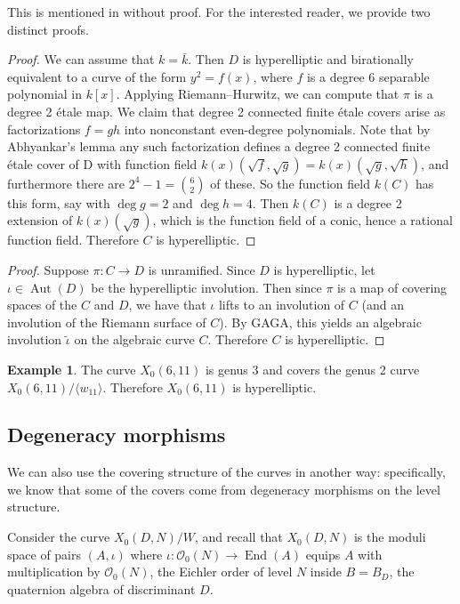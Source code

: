 \documentclass[12pt]{amsart}
\newcommand{\calO}{\mathcal{O}}
\DeclareMathOperator{\Aut}{Aut}
\DeclareMathOperator{\End}{End}
\numberwithin{equation}{subsection}
\theoremstyle{plain}\newtheorem{ithm}{Theorem}
\theoremstyle{plain}\newtheorem{iprop}[ithm]{Proposition}
\theoremstyle{definition}
\newtheorem{example}[equation]{Example}
\theoremstyle{remark}
\newcommand{\Order}{\calO} %
\newcommand{\Curve}[2]{X_0({#1},{#2})} %
\begin{document}
This is mentioned in \cite[Proposition 5]{HasegawaStarcurves} without proof. For the interested reader, we provide two distinct proofs.
\begin{proof}
    We can assume that $k = \bar{k}$. Then $D$ is hyperelliptic and birationally equivalent to a curve of the form $y^2 = f(x)$, where $f$ is a degree 6 separable polynomial in $k[x]$.
    Applying Riemann--Hurwitz, we can compute that $\pi$ is a degree 2 \'etale map.
     We claim that degree 2 connected finite \'etale  covers arise as factorizations $f = gh$ into nonconstant even-degree polynomials. Note that by Abhyankar's lemma any such factorization defines a degree 2 connected finite \'etale cover of D with function field
     $k(x)(\sqrt{f},\sqrt{g}) = k(x)(\sqrt{g},\sqrt{h})$, and furthermore there are $2^4 -1 = \binom{6}{2}$ of these.
     So the function field $k(C)$ has this form, say with $\deg g = 2$ and $\deg h = 4$.  Then $k(C)$ is a degree 2 extension of $k(x)(\sqrt{g})$, which is the function field of a conic, hence a rational function field.  Therefore $C$ is hyperelliptic.
\end{proof}

\begin{proof}
    Suppose $ \pi: C \to D$ is unramified. Since $D$ is hyperelliptic, let $\iota \in \Aut(D)$ be the hyperelliptic involution. Then since $\pi$ is a map of covering spaces of the  $C$ and $D$, we have that $\iota$ lifts to an involution of $C$ (and an involution of the Riemann surface of $C$). By GAGA, this yields an algebraic involution $\tilde{\iota}$ on the algebraic curve $C$. Therefore $C$ is hyperelliptic.
\end{proof}

\begin{example}
The curve $\Curve{6}{11}$ is genus 3 and covers the genus 2 curve $\Curve{6}{11}/\langle w_{11} \rangle$. Therefore $\Curve{6}{11}$ is hyperelliptic.
\end{example}


\subsection{Degeneracy morphisms}\label{sec:degeneracy}
We can also use the covering structure of the curves in another way: specifically, we know that some of the covers come from degeneracy morphisms on the level structure.

Consider the curve $\Curve{D}{N}/W$, and recall that $\Curve{D}{N}$ is the moduli space of pairs $(A, \iota)$ where $\iota : \Order_0(N) \to \End(A)$ equips $A$ with multiplication by $\Order_0(N)$, the Eichler order of level $N$ inside $B = B_D$, the quaternion algebra of discriminant $D$. 
\end{document}
